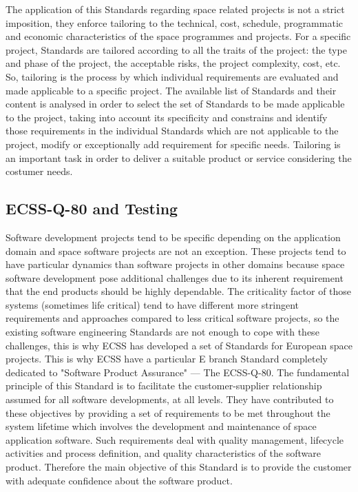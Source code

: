 The application of this Standards regarding space related projects is not a strict imposition, they enforce
tailoring to the technical, cost, schedule, programmatic and economic characteristics of the space programmes and projects.
For a specific project, Standards are tailored according to all the traits of the project: the type and 
phase of the project, the acceptable risks, the project complexity, cost, etc.
So, tailoring is the process by which individual requirements are evaluated and made applicable to a specific project.
The available list of Standards and their content is analysed in order to select the set of Standards to be made applicable to the project, taking 
into account its specificity and constrains and identify those requirements in the individual Standards which are not 
applicable to the project, modify or exceptionally add requirement for specific needs\cite{ecss-s-st-00c}.
Tailoring is an important task in order to deliver a suitable product or service considering the costumer needs.

\subsection{ECSS-Q-80 and Testing}\label{sec:stand}
Software development projects tend to be specific depending on the application domain and 
space software projects are not an exception. These projects tend to have particular dynamics than software projects
in other domains because space software development pose additional challenges due to its inherent
requirement that the end products should be highly dependable.
The criticality factor of those systems (sometimes life critical) tend to have different more stringent requirements and approaches 
compared to less critical software projects, so
the existing software engineering Standards are not enough to cope with these challenges, this is why \ac{ECSS} has developed a set of Standards for European
space projects\cite{Ahmad2010AgileECSS,10.1109/SESS.1997.595952}.
This is why \ac{ECSS} have a particular E branch Standard completely dedicated to "Software Product Assurance" --- The ECSS-Q-80\cite{ecss-q-st-80c}.
The fundamental principle of this Standard is to facilitate the
customer-supplier relationship assumed for all software developments, at all levels.
They have contributed to these objectives by providing a set of requirements to be
met throughout the system lifetime which involves the development and
maintenance of space application software. Such requirements deal with quality
management, lifecycle activities and process definition, and quality
characteristics of the software product\cite{Mattiello-FranciscoSanAmbJogCos:2007:BrSoIn}.
Therefore the main objective of this Standard is to provide the customer with adequate confidence about the software product.\\

